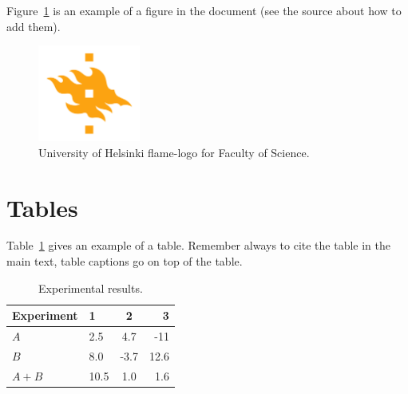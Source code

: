 Figure~\ref{fig:logo} is an example of a figure in the document (see the source about how to add them).

\begin{figure}[ht]
\begin{center}
\includegraphics[width=0.3\textwidth]{template/figures/HY-logo-ml.png}
\caption{University of Helsinki flame-logo for Faculty of Science.\label{fig:logo}}
\end{center}
\end{figure}

\section{Tables}

Table~\ref{table:results} gives an example of a table.
Remember always to cite the table in the main text, table captions go on top of the table.

\begin{table}[h] %
\begin{center}
\caption{Experimental results.\label{table:results}} %
\begin{tabular}{l||l c r}
Experiment & 1 & 2 & 3 \\
\hline \hline
$A$ & 2.5 & 4.7 & -11 \\
$B$ & 8.0 & -3.7 & 12.6 \\
$A+B$ & 10.5 & 1.0 & 1.6 \\
\hline
%
\end{tabular}
\end{center}
\end{table}


